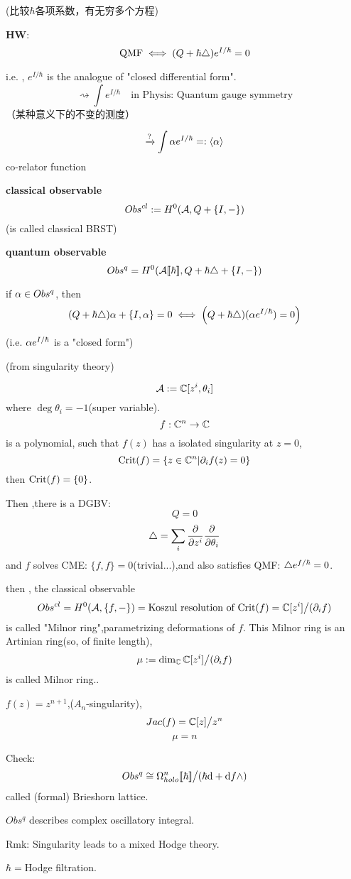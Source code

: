 (比较$\hbar$各项系数，有无穷多个方程)

\textbf{HW}:
$$\text{QMF}\iff (Q+\hbar\triangle)e^{I/\hbar}=0$$

i.e. , $e^{I/\hbar}$ is the analogue of "closed differential form".
$$\rightsquigarrow\int e^{I/\hbar}\quad
\text{in Physis: Quantum gauge symmetry}$$
（某种意义下的不变的测度）

$$\xrightarrow{?}\int \alpha e^{I/\hbar}=:\langle\alpha\rangle$$
co-relator function

\textbf{classical observable}
$$Obs^{cl}:=H^0(\mathcal{A},Q+\{I,-\})$$
(is called classical BRST)

\textbf{quantum observable}
$$Obs^q=H^0(\mathcal{A}[\![\hbar]\!],Q+\hbar\triangle+\{I,-\})$$

if $\alpha\in Obs^q$, then
$$(Q+\hbar\triangle)\alpha+\{I,\alpha\}=0
\iff\left
(Q+\hbar\triangle)(\alpha e^{I/\hbar})=0
\right)$$

(i.e. $\alpha e^{I/\hbar}$ is a "closed form")

\begin{example}(from singularity theory)

$$\mathcal{A}:=\mathbb{C}[z^i,\theta_i]$$
where $\deg\theta_i=-1$(super variable).
$$f:\mathbb{C}^n\to\mathbb{C}$$
is a polynomial, such that $f(z)$ has a isolated singularity  at $z=0$,
$$\operatorname{Crit}(f)=\{z\in\mathbb{C}^n|\partial_if(z)=0\}$$
then $\operatorname{Crit}(f)=\{0\}$.

Then ,there is a DGBV:
$$Q=0$$
$$\triangle=\sum_i\frac{\partial } {\partial z^i}\frac{\partial } {\partial \theta_i}$$
and $f$ solves CME: $\{f,f\}=0$(trivial...),and also satisfies QMF:
$\triangle e^{f/\hbar}=0$.
\end{example}

then , the classical observable
$$Obs^{cl}=H^0(\mathcal{A},\{f,-\})=
\text{Koszul resolution of $\operatorname{Crit}(f)$}
=\mathbb{C}[z^i]\big/(\partial_if)$$
is called "Milnor ring",parametrizing deformations of $f$.
This Milnor ring is an Artinian ring(so, of finite length),
$$\mu:=\dim_{\mathbb{C}}\mathbb{C}[z^i]\big/(\partial_if)$$
is called Milnor ring..

\begin{example}
$f(z)=z^{n+1}$,($A_n$-singularity),
$$Jac(f)=\mathbb{C}[z]\big/z^n$$
$$\mu=n$$
\end{example}

Check:
$$Obs^q\cong\Omega_{holo}^n[\![\hbar]\!]\big/
(\hbar\mathrm{d}+\mathrm{d} f\wedge)$$
called (formal) Brieshorn lattice.

$Obs^q$ describes complex oscillatory integral.

Rmk: Singularity leads to a mixed Hodge theory.

$\hbar=$Hodge filtration.

